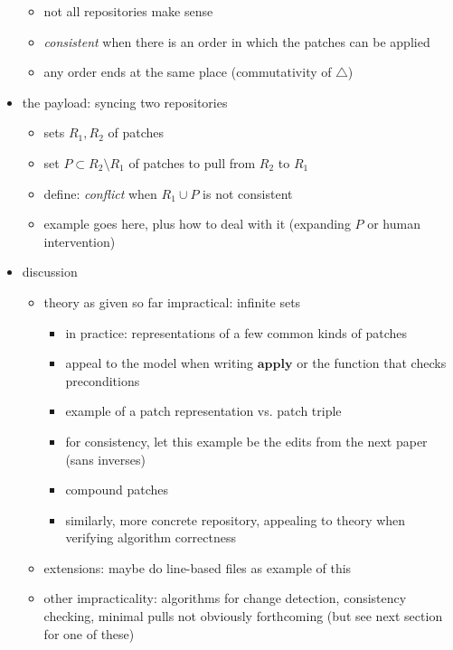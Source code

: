 \documentclass{article}
\newcommand{\apply}{\ensuremath{\mathbf{apply}}\xspace}
\begin{document}
\begin{itemize}
\begin{itemize}
            \item not all repositories make sense
            \item \emph{consistent} when there is an order in which the
                patches can be applied
            \item any order ends at the same place (commutativity of
                $\triangle$)
        \end{itemize}
    \item the payload: syncing two repositories
        \begin{itemize}
            \item sets $R_1, R_2$ of patches
            \item set $P \subset R_2 \setminus R_1$ of patches to pull from
                $R_2$ to $R_1$
            \item define: \emph{conflict} when $R_1 \cup P$ is not
                consistent
            \item example goes here, plus how to deal with it (expanding $P$
                or human intervention)
        \end{itemize}
    \item discussion
        \begin{itemize}
            \item theory as given so far impractical: infinite sets
                \begin{itemize}
                    \item in practice: representations of a few common kinds
                        of patches
                    \item appeal to the model when writing \apply or the
                        function that checks preconditions
                    \item example of a patch representation vs. patch triple
                    \item for consistency, let this example be the edits
                        from the next paper (sans inverses)
                    \item compound patches
                    \item similarly, more concrete repository, appealing to
                        theory when verifying algorithm correctness
                \end{itemize}
            \item extensions: maybe do line-based files as example of this
            \item other impracticality: algorithms for change detection,
                consistency checking, minimal pulls not obviously
                forthcoming (but see next section for one of these)
        \end{itemize}
\end{itemize}
\end{document}
